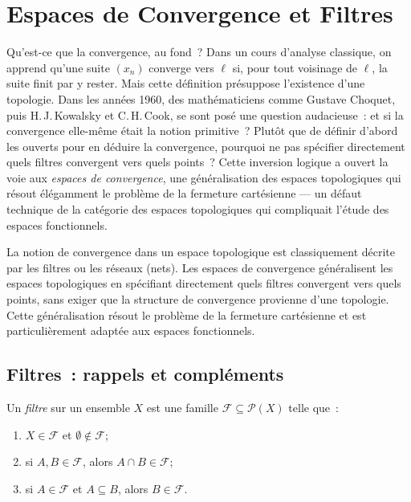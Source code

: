 \chapter{Espaces de Convergence et Filtres}
\label{ch:convergence}

Qu'est-ce que la convergence, au fond~? Dans un cours d'analyse classique, on apprend qu'une suite $(x_n)$ converge vers $\ell$ si, pour tout voisinage de $\ell$, la suite finit par y rester. Mais cette d\'efinition pr\'esuppose l'existence d'une topologie. Dans les ann\'ees 1960, des math\'ematiciens comme Gustave Choquet, puis H.\,J.\,Kowalsky et C.\,H.\,Cook, se sont pos\'e une question audacieuse~: et si la convergence elle-m\^eme \'etait la notion primitive~? Plut\^ot que de d\'efinir d'abord les ouverts pour en d\'eduire la convergence, pourquoi ne pas sp\'ecifier directement quels filtres convergent vers quels points~? Cette inversion logique a ouvert la voie aux \emph{espaces de convergence}, une g\'en\'eralisation des espaces topologiques qui r\'esout \'el\'egamment le probl\`eme de la fermeture cart\'esienne --- un d\'efaut technique de la cat\'egorie des espaces topologiques qui compliquait l'\'etude des espaces fonctionnels.

\begin{intuition}
La notion de convergence dans un espace topologique est classiquement d\'ecrite par les
filtres ou les r\'eseaux (nets). Les espaces de convergence g\'en\'eralisent les espaces
topologiques en sp\'ecifiant directement quels filtres convergent vers quels points, sans
exiger que la structure de convergence provienne d'une topologie. Cette g\'en\'eralisation
r\'esout le probl\`eme de la fermeture cart\'esienne et est particuli\`erement adapt\'ee
aux espaces fonctionnels.
\end{intuition}

\section{Filtres~: rappels et compl\'ements}

\begin{definition}[Filtre]
Un \emph{filtre} sur un ensemble $X$ est une famille $\mathcal{F} \subseteq \mathcal{P}(X)$
telle que~:
\begin{enumerate}
  \item $X \in \mathcal{F}$ et $\emptyset \notin \mathcal{F}$;
  \item si $A, B \in \mathcal{F}$, alors $A \cap B \in \mathcal{F}$;
  \item si $A \in \mathcal{F}$ et $A \subseteq B$, alors $B \in \mathcal{F}$.
\end{enumerate}
\end{definition}

